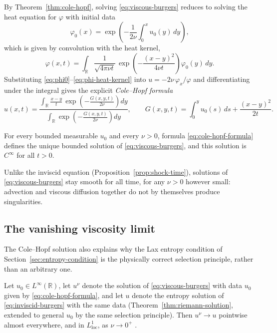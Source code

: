 By Theorem~\ref{thm:cole-hopf}, solving \eqref{eq:viscous-burgers} reduces
to solving the heat equation for $\varphi$ with initial data
\begin{equation}
  \label{eq:phi0}
  \varphi_0(x) = \exp\left(-\frac{1}{2\nu}\int_0^x u_0(y)\, dy\right),
\end{equation}
which is given by convolution with the heat kernel,
\begin{equation}
  \label{eq:phi-heat-kernel}
  \varphi(x,t) = \int_{\mathbb{R}} \frac{1}{\sqrt{4\pi\nu t}}\,
    \exp\left(-\frac{(x-y)^2}{4\nu t}\right) \varphi_0(y)\, dy.
\end{equation}
Substituting \eqref{eq:phi0}--\eqref{eq:phi-heat-kernel} into
$u=-2\nu\,\varphi_x/\varphi$ and differentiating under the integral gives
the explicit \emph{Cole--Hopf formula}
\begin{equation}
  \label{eq:cole-hopf-formula}
  u(x,t) = \frac{\displaystyle\int_{\mathbb{R}} \frac{x-y}{t}\, \exp\left(-\frac{G(x,y,t)}{2\nu}\right) dy}
                {\displaystyle\int_{\mathbb{R}} \exp\left(-\frac{G(x,y,t)}{2\nu}\right) dy},
  \qquad
  G(x,y,t) = \int_0^y u_0(s)\, ds + \frac{(x-y)^2}{2t}.
\end{equation}

\begin{corollary}
\label{cor:global-smoothness}
For every bounded measurable $u_0$ and every $\nu>0$, formula
\eqref{eq:cole-hopf-formula} defines the unique bounded solution of
\eqref{eq:viscous-burgers}, and this solution is $C^\infty$ for all
$t>0$.
\end{corollary}

Unlike the inviscid equation (Proposition~\ref{prop:shock-time}),
solutions of \eqref{eq:viscous-burgers} stay smooth for all time, for
any $\nu>0$ however small: advection and viscous diffusion together do
not by themselves produce singularities.

\subsection{The vanishing viscosity limit}
\label{subsec:vanishing-viscosity}

The Cole--Hopf solution also explains why the Lax entropy condition of
Section~\ref{sec:entropy-condition} is the physically correct selection
principle, rather than an arbitrary one.

\begin{theorem}
\label{thm:vanishing-viscosity}
Let $u_0\in L^\infty(\mathbb{R})$, let $u^\nu$ denote the solution of
\eqref{eq:viscous-burgers} with data $u_0$ given by
\eqref{eq:cole-hopf-formula}, and let $u$ denote the entropy solution of
\eqref{eq:inviscid-burgers} with the same data
(Theorem~\ref{thm:riemann-solution}, extended to general $u_0$ by the same
selection principle). Then $u^\nu \to u$ pointwise almost everywhere,
and in $L^1_{\mathrm{loc}}$, as $\nu \to 0^+$ \cite{hopf1950}.
\end{theorem}

